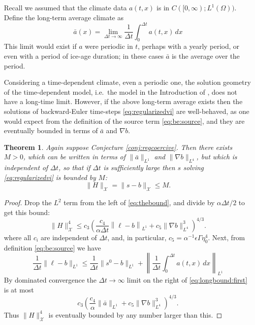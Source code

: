 \documentclass[12pt]{article}
\newtheorem{theorem}{Theorem}
\newcommand{\cX}{\ensuremath{\mathcal{X}}}
\newcommand{\grad}{\ensuremath{\nabla}}
\newcommand{\eps}{\ensuremath{\epsilon}}
\begin{document}
Recall we assumed that the climate data $a(t,x)$ is in $C([0,\infty); L^1(\Omega))$.  Define the long-term average climate as
\begin{equation}
\bar a(x) = \lim_{\Delta t \to \infty} \frac{1}{\Delta t} \int_0^{\Delta t} a(t,x)\,dx
\end{equation}
This limit would exist if $a$ were periodic in $t$, perhaps with a yearly period, or even with a period of ice-age duration; in these cases $\bar a$ is the average over the period.

Considering a time-dependent climate, even a periodic one, the solution geometry of the time-dependent model, i.e.~the model in the Introduction of \cite{Bueler2025}, does not have a long-time limit.  However, if the above long-term average exists then the solutions of backward-Euler time-steps \eqref{eq:regularizedvi} are well-behaved, as one would expect from the definition of the source term \eqref{eq:be:source}, and they are eventually bounded in terms of $\bar a$ and $\grad b$.

\begin{theorem}
Again suppose Conjecture \ref{conj:regcoercive}.  Then there exists $M>0$, which can be written in terms of $\|\bar a\|_{L^1}$ and $\|\grad b\|_{L^4}$, but which is independent of $\Delta t$, so that if $\Delta t$ is sufficiently large then $s$ solving \eqref{eq:regularizedvi} is bounded by $M$:
\begin{equation}
\|H\|_{\cX} = \|s-b\|_{\cX} \le M.  \label{eq:longbound}
\end{equation}
\end{theorem}

\begin{proof}
Drop the $L^2$ term from the left of \eqref{eq:thebound}, and divide by $\alpha \Delta t/2$ to get this bound:
\begin{equation}
\|H\|_{\cX}^4 \le c_3 \left(\frac{c_4}{\alpha \Delta t} \left\|\ell-b\right\|_{L^1}  + c_5 \|\grad b\|_{L^4}^3\right)^{4/3}. \label{eq:longbound:first}
\end{equation}
where all $c_i$ are independent of $\Delta t$, and, in particular, $c_5=\alpha^{-1} \eps \Gamma \eta_0^4$.  Next, from definition \eqref{eq:be:source} we have
\begin{equation}
\frac{1}{\Delta t} \|\ell-b\|_{L^1} \le \frac{1}{\Delta t} \|s^0-b\|_{L^1} + \left\|\frac{1}{\Delta t} \int_0^{\Delta t} a(t,x)\,dx\right\|_{L^1}
\end{equation}
By dominated convergence the $\Delta t\to\infty$ limit on the right of \eqref{eq:longbound:first} is at most
\begin{equation}
c_3 \left(\frac{c_4}{\alpha} \|\bar a\|_{L^1}  + c_5 \|\grad b\|_{L^4}^3\right)^{4/3}.
\end{equation}
Thus $\|H\|_{\cX}^4$ is eventually bounded by any number larger than this.
\end{proof}




\end{document}
